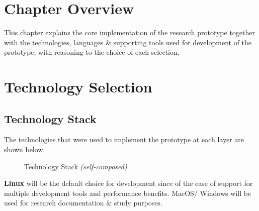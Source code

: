 \section{Chapter Overview}
This chapter explains the core implementation of the research prototype together with the technologies, languages \& supporting tools used for development of the prototype, with reasoning to the choice of each selection.

\section{Technology Selection}

\subsection{Technology Stack}
The technologies that were used to implement the prototype at each layer are shown below.


\begin{figure}[h!]
\centering
{}
\caption{Technology Stack \textit{(self-composed)}}
\label{fig:teck-stack}
\end{figure}


\textbf{Linux} will be the default choice for development since of the ease of support for multiple development tools and performance benefits. MacOS/ Windows will be used for research documentation \& study purposes.

